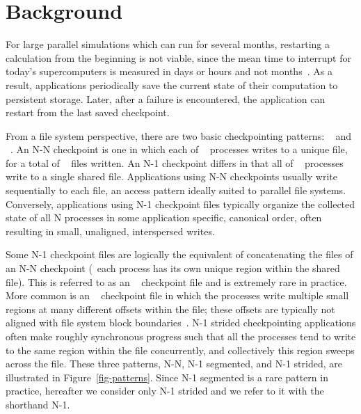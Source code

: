 \section{Background}
\label{motivation}

For large parallel simulations which can run for several months, restarting a
calculation from the beginning is not viable, since the mean time to interrupt
for today's supercomputers is measured in days or hours and not
months~\cite{google-failure,schroeder-failure}.  As a result, applications 
periodically save
the current state of their computation to persistent storage.  Later, after a
failure is encountered, the application can restart from the last saved
checkpoint. 


From a file system perspective,
there are two basic checkpointing patterns: ~ and ~.  An
N-N checkpoint is one in which each of ~ processes writes to a unique
file, for a total of ~ files written.  An N-1 checkpoint differs in
that all of ~ processes write to a single shared file.  Applications
using N-N checkpoints usually write sequentially to each file, an access
pattern ideally suited to parallel file systems. Conversely, applications using
N-1 checkpoint files typically organize the collected state of all N processes
in some application specific, canonical order, often resulting in 
small, unaligned, interspersed writes.

Some N-1 checkpoint files are logically the equivalent of concatenating the
files of an N-N checkpoint (\ie\ each process has its own unique region
within the shared file).  This is referred to as an ~
checkpoint file and is extremely rare in practice.  More common is an
~ checkpoint file in which the processes write multiple small
regions at many different offsets within the file; these offsets are typically
not aligned with file system block boundaries~\cite{plfs-maps}.  N-1 strided
checkpointing applications often make roughly synchronous progress such that
all the processes tend to write to the same region within the file concurrently, and collectively this region sweeps across the file.
These three patterns, N-N, N-1 segmented, and N-1 strided, are
illustrated in Figure~\ref{fig-patterns}.  Since N-1 segmented is a rare pattern
in practice, hereafter we consider only N-1 strided and we refer to it with the
shorthand N-1. 

